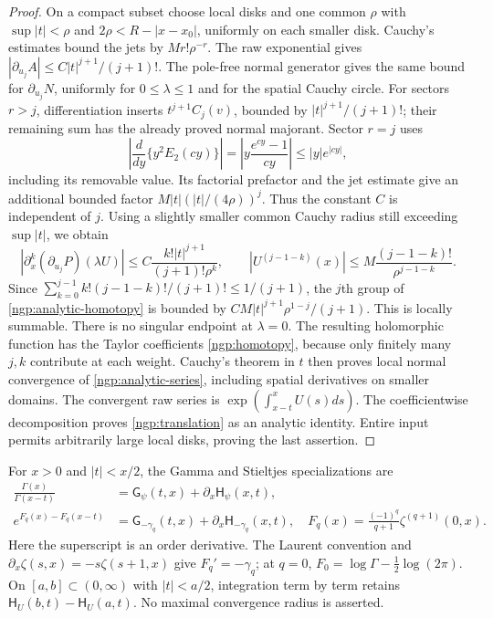 \begin{proof}
On a compact subset choose local disks and one common $\rho$ with
$\sup|t|<\rho$ and $2\rho<R-|x-x_0|$, uniformly on each smaller
disk. Cauchy's estimates bound the jets by $Mr!\rho^{-r}$.
The raw exponential gives
$|\partial_{u_j}A|\le C|t|^{j+1}/(j+1)!$.
The pole-free normal generator gives the same bound for
$\partial_{u_j}N$, uniformly for $0\le\lambda\le1$ and for the
spatial Cauchy circle. For sectors $r>j$, differentiation inserts
$t^{j+1}C_j(v)$, bounded by $|t|^{j+1}/(j+1)!$; their remaining
sum has the already proved normal majorant. Sector $r=j$ uses
\[
 \left|\frac{d}{dy}\{y^2E_2(cy)\}\right|
 =\left|y\frac{e^{cy}-1}{cy}\right|\le |y|e^{|cy|},
\]
including its removable value. Its factorial prefactor and the jet
estimate give an additional bounded factor
$M|t|(|t|/(4\rho))^j$. Thus the constant $C$ is independent of $j$.
Using a slightly smaller common Cauchy radius still exceeding
$\sup|t|$, we obtain
\[
 |\partial_x^k(\partial_{u_j}P)(\lambda U)|
 \le C\frac{k!|t|^{j+1}}{(j+1)!\rho^k},\qquad
 |U^{(j-1-k)}(x)|\le M\frac{(j-1-k)!}{\rho^{j-1-k}}.
\]
Since $\sum_{k=0}^{j-1}k!(j-1-k)!/(j+1)!\le1/(j+1)$,
the $j$th group of \eqref{ngp:analytic-homotopy} is bounded by
$CM|t|^{j+1}\rho^{1-j}/(j+1)$. This is locally summable.
There is no singular endpoint at $\lambda=0$.
The resulting holomorphic function has the Taylor coefficients
\eqref{ngp:homotopy}, because only finitely many $j,k$ contribute
at each weight. Cauchy's theorem in $t$ then proves local normal
convergence of \eqref{ngp:analytic-series}, including spatial
derivatives on smaller domains.
The convergent raw series is $\exp(\int_{x-t}^xU(s)ds)$.
The coefficientwise decomposition proves \eqref{ngp:translation}
as an analytic identity. Entire input permits arbitrarily large local
disks, proving the last assertion.
\end{proof}

For $x>0$ and $|t|<x/2$, the Gamma and Stieltjes specializations are
\begin{align}
 \frac{\Gamma(x)}{\Gamma(x-t)}
 &=\mathsf G_\psi(t,x)+\partial_x\mathsf H_\psi(x,t),
 \label{ngp:gamma}\\
 e^{F_q(x)-F_q(x-t)}
 &=\mathsf G_{-\gamma_q}(t,x)+\partial_x\mathsf H_{-\gamma_q}(x,t),
 \quad F_q(x)=\frac{(-1)^q}{q+1}\zeta^{(q+1)}(0,x).
 \label{ngp:stieltjes}
\end{align}
Here the superscript is an order derivative. The Laurent convention and
$\partial_x\zeta(s,x)=-s\zeta(s+1,x)$ give $F_q'=-\gamma_q$;
at $q=0$, $F_0=\log\Gamma-\tfrac12\log(2\pi)$.
On $[a,b]\subset(0,\infty)$ with $|t|<a/2$, integration term by
term retains $\mathsf H_U(b,t)-\mathsf H_U(a,t)$.
No maximal convergence radius is asserted.

